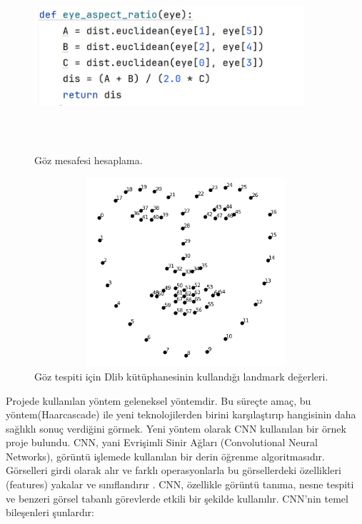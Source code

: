 \documentclass[12pt, a4paper]{article}
\begin{document}
	\begin{figure}
		\centering
		\includegraphics[width=10cm, height=7cm, keepaspectratio]{kod.jpg}
		\caption{Göz mesafesi hesaplama.} 
	\end{figure} \par \begin{figure}[!h]
		\centering
		\includegraphics[width=17cm, height=7cm, keepaspectratio]{landmarks.jpg}
		\caption{Göz tespiti için Dlib kütüphanesinin kullandığı landmark değerleri\cite{amos2018}.} 
		\par
	\end{figure} \par
	Projede kullanılan yöntem geleneksel yöntemdir. Bu süreçte amaç, bu yöntem(Haarcascade) ile yeni teknolojilerden birini karşılaştırıp hangisinin daha sağlıklı sonuç verdiğini görmek.
	Yeni yöntem olarak CNN kullanılan bir örnek proje \cite{superthinking} bulundu.
	CNN, yani Evrişimli Sinir Ağları (Convolutional Neural Networks), görüntü işlemede kullanılan bir derin öğrenme algoritmasıdır. Görselleri girdi olarak alır ve farklı operasyonlarla bu görsellerdeki özellikleri (features) yakalar ve sınıflandırır \cite{cnnnedir}. CNN, özellikle görüntü tanıma, nesne tespiti ve benzeri görsel tabanlı görevlerde etkili bir şekilde kullanılır.
	CNN’nin temel bileşenleri şunlardır:
	
\end{document}
